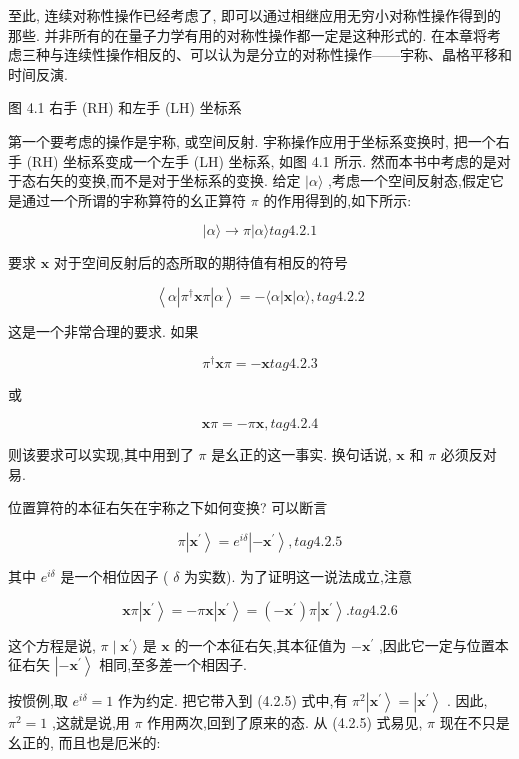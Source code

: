 至此, 连续对称性操作已经考虑了, 即可以通过相继应用无穷小对称性操作得到的那些. 并非所有的在量子力学有用的对称性操作都一定是这种形式的. 在本章将考虑三种与连续性操作相反的、可以认为是分立的对称性操作——宇称、晶格平移和时间反演.


图 4.1 右手 (RH) 和左手 (LH) 坐标系

第一个要考虑的操作是宇称, 或空间反射. 宇称操作应用于坐标系变换时, 把一个右手 (RH) 坐标系变成一个左手 (LH) 坐标系, 如图 4.1 所示. 然而本书中考虑的是对于态右矢的变换,而不是对于坐标系的变换. 给定 $|\alpha \rangle$ ,考虑一个空间反射态,假定它是通过一个所谓的宇称算符的幺正算符 $\pi$ 的作用得到的,如下所示:

$$
\left| {\alpha \rangle \rightarrow \pi }\right| \alpha \rangle tag{4.2.1}
$$

要求 $\mathbf{x}$ 对于空间反射后的态所取的期待值有相反的符号

$$
\left\langle {\alpha \left| {{\pi }^{ \dagger }\mathbf{x}\pi }\right| \alpha }\right\rangle = - \langle \alpha \left| \mathbf{x}\right| \alpha \rangle , tag{4.2.2}
$$

这是一个非常合理的要求. 如果

$$
{\pi }^{ \dagger }\mathbf{x}\pi = - \mathbf{x} tag{4.2.3}
$$

或

$$
\mathbf{x}\pi = - \pi \mathbf{x}, tag{4.2.4}
$$

则该要求可以实现,其中用到了 $\pi$ 是幺正的这一事实. 换句话说, $\mathbf{x}$ 和 $\pi$ 必须反对易.

位置算符的本征右矢在宇称之下如何变换? 可以断言

$$
\pi \left| {\mathbf{x}}^{\prime }\right\rangle = {e}^{i\delta }\left| {-{\mathbf{x}}^{\prime }}\right\rangle , tag{4.2.5}
$$

其中 ${e}^{i\delta }$ 是一个相位因子 ( $\delta$ 为实数). 为了证明这一说法成立,注意

$$
\mathbf{x}\pi \left| {\mathbf{x}}^{\prime }\right\rangle = - \pi \mathbf{x}\left| {\mathbf{x}}^{\prime }\right\rangle = \left( {-{\mathbf{x}}^{\prime }}\right) \pi \left| {\mathbf{x}}^{\prime }\right\rangle . tag{4.2.6}
$$

这个方程是说, $\pi \mid {\mathbf{x}}^{\prime }\rangle$ 是 $\mathbf{x}$ 的一个本征右矢,其本征值为 $- {\mathbf{x}}^{\prime }$ ,因此它一定与位置本征右矢 $\left| {-{\mathbf{x}}^{\prime }}\right\rangle$ 相同,至多差一个相因子.

按惯例,取 ${e}^{i\delta } = 1$ 作为约定. 把它带入到 (4.2.5) 式中,有 ${\pi }^{2}\left| {\mathbf{x}}^{\prime }\right\rangle = \left| {\mathbf{x}}^{\prime }\right\rangle$ . 因此, ${\pi }^{2} = 1$ ,这就是说,用 $\pi$ 作用两次,回到了原来的态. 从 (4.2.5) 式易见, $\pi$ 现在不只是幺正的, 而且也是厄米的:

